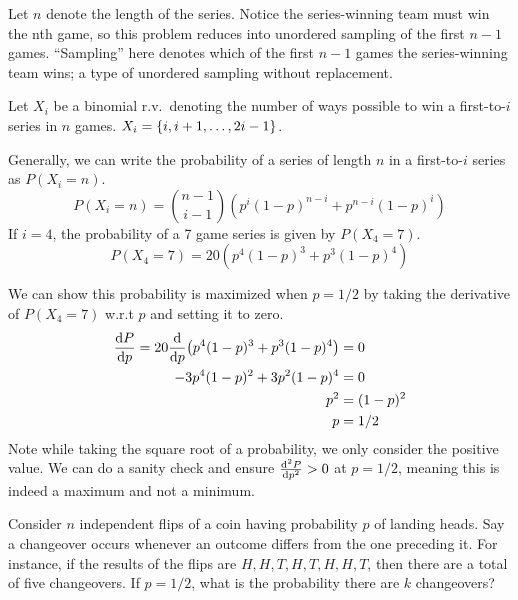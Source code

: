 \documentclass{article}
\begin{document}
    \begin{solution}
        Let $n$ denote the length of the series.
        Notice the series-winning team must win the nth game, so this problem reduces into unordered sampling of the first $n - 1$ games. ``Sampling'' here denotes which of the first $n - 1$ games the series-winning team wins; a type of unordered sampling without replacement. 
        
        Let $X_i$ be a binomial r.v.~denoting the number of ways possible to win a first-to-$i$ series in $n$ games. $X_i = \{i, i + 1, \ldots, 2i - 1\}$.

        Generally, we can write the probability of a series of length $n$ in a first-to-$i$ series as $P(X_i = n)$.
        \begin{equation*}
            P(X_i = n) = \binom{n - 1}{i - 1} (p^{i}(1-p)^{n - i} + p^{n - i}(1-p)^{i})
        \end{equation*}
        If $i = 4$, the probability of a 7 game series is given by $P(X_4 = 7)$.
        \begin{equation}
            P(X_4 = 7) = 20 (p^{4}(1-p)^{3} + p^{3}(1-p)^{4})
        \end{equation}

        We can show this probability is maximized when $p = 1/2$ by taking the derivative of $P(X_4 = 7)$ w.r.t $p$ and setting it to zero.
        \begin{align*}
            \dv{P}{p} = 20 \dv{p} (p^{4}(1-p)^{3} + p^{3}(1-p)^{4}) &= 0 \\
            - 3p^4(1-p)^2 + 3p^2(1-p)^4 &= 0 \\
            p^2 &= (1-p)^2  \\
            p &= 1/2
        \end{align*}
        Note while taking the square root of a probability, we only consider the positive value. We can do a sanity check and ensure $\dv[2]{P}{p} > 0$ at $p = 1/2$, meaning this is indeed a maximum and not a minimum.

        
    \end{solution}


    \nextproblem
    \nextproblem
    \begin{problem}
        Consider $n$ independent flips of a coin having probability $p$ of landing heads. Say a changeover occurs whenever an outcome differs from the one preceding it. For instance, if the results of the flips are $H, H, T, H, T, H, H, T$, then there are a total of five changeovers. If $p = 1/2$, what is the probability there are $k$ changeovers?
    \end{problem}
\end{document}
